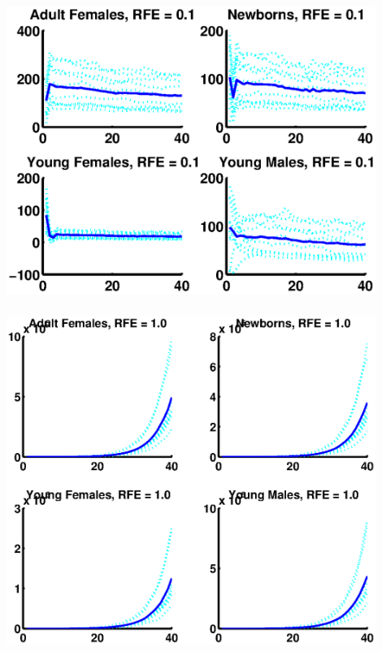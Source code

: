 \documentclass[mathserif]{beamer}
\begin{document}
\begin{frame}
\begin{center}
\frametitle{\insertsection}
\includegraphics[width=0.9\textwidth]{general1}
\end{center}
\end{frame}

\begin{frame}
\begin{center}
\frametitle{\insertsection}
\includegraphics[width=0.9\textwidth]{general10}
\end{center}
\end{frame}
\end{document}
